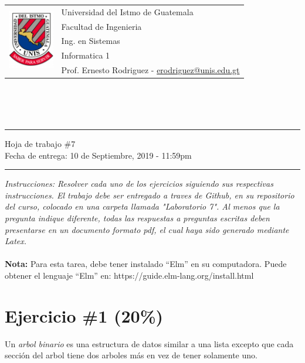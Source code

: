 \documentclass{article}
\newcommand{\horrule}[1]{\rule{\linewidth}{#1}}
\begin{document}
\begin{tabular}{l l}
\multirow{5}{*}{\includegraphics[width=2cm]{../../recursos/logo.png}}
 & Universidad del Istmo de Guatemala \\
 & Facultad de Ingenieria \\
 & Ing. en Sistemas \\
 & Informatica 1 \\
 & Prof. Ernesto Rodriguez - \href{mailto:erodriguez@unis.edu.gt}{erodriguez@unis.edu.gt} \\
\end{tabular}
\\\\\\

\begin{center}
        \horrule{0.5pt}
        \huge{Hoja de trabajo \#7} \\
        \large{Fecha de entrega: 10 de Septiembre, 2019 - 11:59pm} \\
        \horrule{1pt}
\end{center}

\emph{Instrucciones: Resolver cada uno de los ejercicios siguiendo sus respectivas
instrucciones. El trabajo debe ser entregado a traves de Github, en su repositorio del curso, colocado en una
carpeta llamada "Laboratorio 7". Al menos que la pregunta indique diferente, todas las
respuestas a preguntas escritas deben presentarse en un documento formato pdf, el cual
haya sido generado mediante Latex. }\\\\

{\bf Nota: } Para esta tarea, debe tener instalado ``Elm'' en su computadora. Puede obtener
el lenguaje ``Elm'' en: https://guide.elm-lang.org/install.html

\section*{Ejercicio \#1 (20\%)}

Un \emph{arbol binario} es una estructura de datos similar a una lista
excepto que cada secci\'on del arbol tiene dos arboles m\'as en vez
de tener solamente uno.
\end{document}
